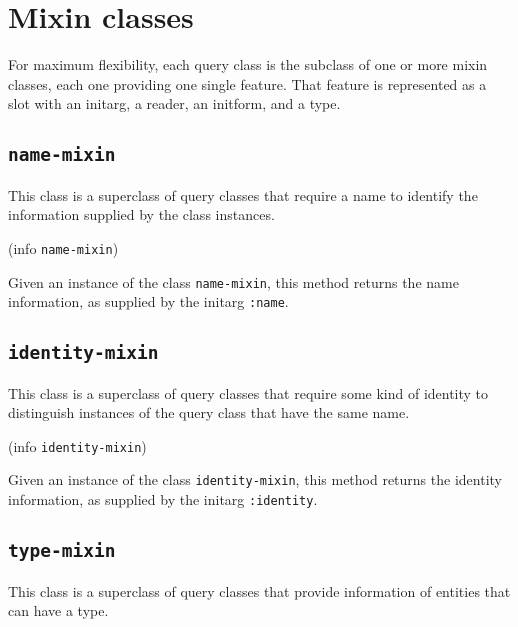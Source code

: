 \section{Mixin classes}

For maximum flexibility, each query class is the subclass of one or
more mixin classes, each one providing one single feature.  That
feature is represented as a slot with an initarg, a reader, an
initform, and a type.

\subsection{\texttt{name-mixin}}
\label{sec-name-mixin}


This class is a superclass of query classes that require a name to
identify the information supplied by the class instances.


 {(info {\tt name-mixin})}

Given an instance of the class \texttt{name-mixin}, this method
returns the name information, as supplied by the initarg
\texttt{:name}.

\subsection{\texttt{identity-mixin}}
\label{sec-identity-mixin}


This class is a superclass of query classes that require some kind of
identity to distinguish instances of the query class that have the
same name.


 {(info {\tt identity-mixin})}

Given an instance of the class \texttt{identity-mixin}, this method
returns the identity information, as supplied by the initarg
\texttt{:identity}.

\subsection{\texttt{type-mixin}}
\label{sec-type-mixin}


This class is a superclass of query classes that provide information
of entities that can have a type.

